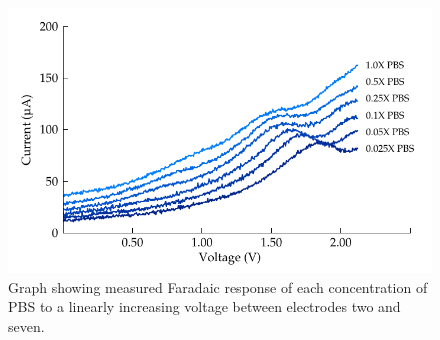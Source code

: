       \begin{figure}
        \centering
        \includegraphics{content/pt2/08-InterfaceParameters/graphics/faradaicOnset-all-average}
        \caption{\label{fig:pt2-faradaic_measurement}Graph showing measured Faradaic response of each concentration of PBS to a linearly increasing voltage between electrodes two and seven.}
      \end{figure}

